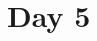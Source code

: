 \documentclass[11pt]{article}
\begin{document}

\newpage

\section{Day 5}



%
%
%
%
%
%
%
%
%
%
%
%
%
\end{document}
